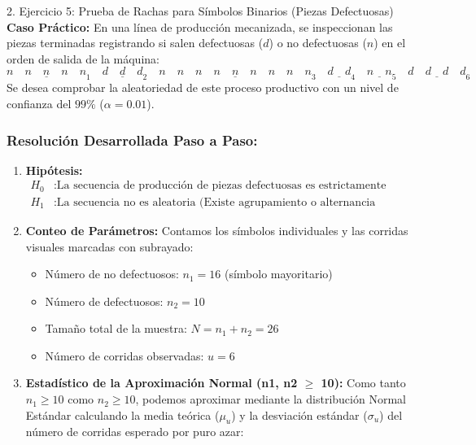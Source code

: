 \documentclass[11pt,a4paper]{article}
\begin{document}
\begin{subsection}{2. Ejercicio 5: Prueba de Rachas para Símbolos Binarios (Piezas Defectuosas)}
    \textbf{Caso Práctico:} En una línea de producción mecanizada, se inspeccionan las piezas terminadas registrando si salen defectuosas ($d$) o no defectuosas ($n$) en el orden de salida de la máquina:
    \[ \underline{n \quad n \quad n \quad n \quad n}_{1} \quad \underline{d \quad d \quad d}_{2} \quad \underline{n \quad n \quad n \quad n \quad n \quad n \quad n \quad n \quad n}_{3} \quad \underline{d \quad d}_{4} \quad \underline{n \quad n}_{5} \quad \underline{d \quad d \quad d \quad d}_{6} \]
    Se desea comprobar la aleatoriedad de este proceso productivo con un nivel de confianza del $99\%$ ($\alpha = 0.01$).

    \subsubsection*{Resolución Desarrollada Paso a Paso:}
    \begin{enumerate}
        \item \textbf{Hipótesis:}
              \begin{align*}
                  H_0&: \text{La secuencia de producción de piezas defectuosas es estrictamente aleatoria} \\
                  H_1&: \text{La secuencia no es aleatoria (Existe agrupamiento o alternancia sistemática, bilateral)}
              \end{align*}
        \item \textbf{Conteo de Parámetros:}
              Contamos los símbolos individuales y las corridas visuales marcadas con subrayado:
              \begin{itemize}
                  \item Número de no defectuosos: \textbf{$n_1 = 16$} (símbolo mayoritario)
                  \item Número de defectuosos: \textbf{$n_2 = 10$}
                  \item Tamaño total de la muestra: $N = n_1 + n_2 = 26$
                  \item Número de corridas observadas: \textbf{$u = 6$}
              \end{itemize}
        \item \textbf{Estadístico de la Aproximación Normal (n1, n2 $\ge$ 10):}
              Como tanto $n_1 \ge 10$ como $n_2 \ge 10$, podemos aproximar mediante la distribución Normal Estándar calculando la media teórica ($\mu_u$) y la desviación estándar ($\sigma_u$) del número de corridas esperado por puro azar:

\end{enumerate}
\end{subsection}
\end{document}
